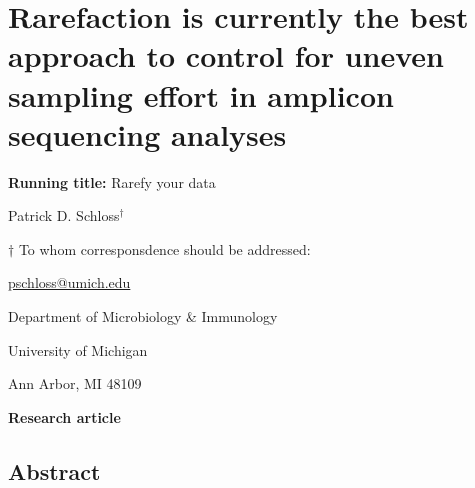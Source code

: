 \documentclass[
]{article}
\author{}
\date{\vspace{-2.5em}}
\begin{document}
\hypertarget{rarefaction-is-currently-the-best-approach-to-control-for-uneven-sampling-effort-in-amplicon-sequencing-analyses}{%
\section{Rarefaction is currently the best approach to control for
uneven sampling effort in amplicon sequencing
analyses}\label{rarefaction-is-currently-the-best-approach-to-control-for-uneven-sampling-effort-in-amplicon-sequencing-analyses}}

\vspace{20mm}

\textbf{Running title:} Rarefy your data

\vspace{20mm}

Patrick D. Schloss\({^\dagger}\)

\vspace{40mm}

\({\dagger}\) To whom corresponsdence should be addressed:

\href{mailto:pschloss@umich.edu}{pschloss@umich.edu}

Department of Microbiology \& Immunology

University of Michigan

Ann Arbor, MI 48109

\vspace{20mm}

\textbf{Research article}

\newpage

\hypertarget{abstract}{%
\subsection{Abstract}\label{abstract}}
\end{document}
